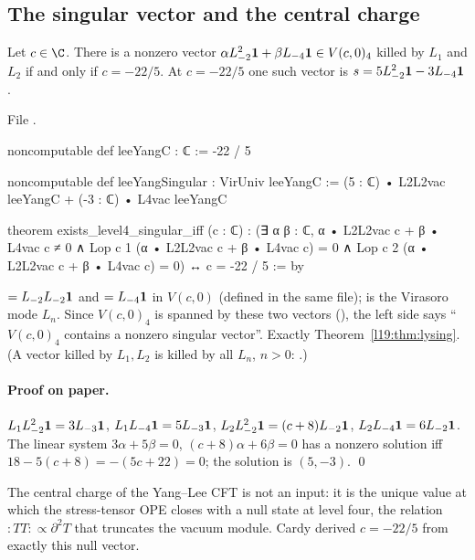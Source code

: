 \subsection{The singular vector and the central charge}

\begin{theorem}\label{l19:thm:lysing}
Let $c\in\C$. There is a nonzero vector $\alpha L_{-2}^2\mathbf{1} + \beta L_{-4}\mathbf{1}\in V(c,0)_4$ killed
by $L_1$ and $L_2$ if and only if $c = -22/5$. At $c=-22/5$ one such vector is
$s = 5L_{-2}^2\mathbf{1} - 3L_{-4}\mathbf{1}$.
\end{theorem}

\noindent File .
\begin{leancode}
noncomputable def leeYangC : ℂ := -22 / 5

noncomputable def leeYangSingular : VirUniv leeYangC :=
  (5 : ℂ) • L2L2vac leeYangC + (-3 : ℂ) • L4vac leeYangC

theorem exists_level4_singular_iff (c : ℂ) :
    (∃ α β : ℂ, α • L2L2vac c + β • L4vac c ≠ 0
        ∧ Lop c 1 (α • L2L2vac c + β • L4vac c) = 0
        ∧ Lop c 2 (α • L2L2vac c + β • L4vac c) = 0)
      ↔ c = -22 / 5 := by
\end{leancode}

\begin{dictionary}
 $= L_{-2}L_{-2}\mathbf{1}$ and  $= L_{-4}\mathbf{1}$ in $V(c,0)$
(defined in the same file);  is the Virasoro mode $L_n$. Since $V(c,0)_4$ is spanned by
these two vectors (), the left side says ``$V(c,0)_4$ contains a nonzero singular
vector''. Exactly Theorem~\ref{l19:thm:lysing}. (A vector killed by $L_1,L_2$ is killed by all $L_n$,
$n>0$: .)
\end{dictionary}

\paragraph{Proof on paper.} $L_1L_{-2}^2\mathbf{1} = 3L_{-3}\mathbf{1}$, $L_1L_{-4}\mathbf{1} = 5L_{-3}\mathbf{1}$,
$L_2L_{-2}^2\mathbf{1} = (c+8)L_{-2}\mathbf{1}$, $L_2L_{-4}\mathbf{1} = 6L_{-2}\mathbf{1}$. The linear system
$3\alpha+5\beta = 0$, $(c+8)\alpha+6\beta = 0$ has a nonzero solution iff $18-5(c+8) = -(5c+22) = 0$;
the solution is $(5,-3)$. \qed

\begin{physics}
The central charge of the Yang--Lee CFT is not an input: it is the unique value at which the
stress-tensor OPE closes with a null state at level four, the relation $:TT: \propto \partial^2T$ that
truncates the vacuum module. Cardy derived $c = -22/5$ from exactly this null vector.
\end{physics}

